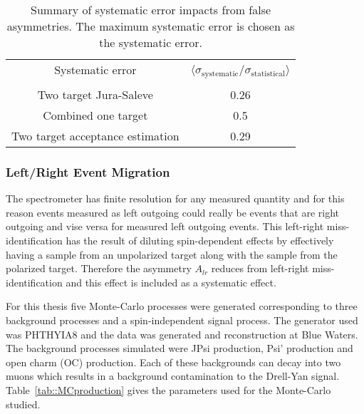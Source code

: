 \begin{table}[h!t]
  \centering
  \begin{tabular}{|c|c|}
    \hline Systematic error& \multirow{2}{9em}{$\langle
      \sigma_{\mathrm{systematic}}/\sigma_{\mathrm{statistical}}
      \rangle$}\\ & \\ \hline
    
    Two target Jura-Saleve& 0.26\\ \hline

    Combined one target& 0.5\\ \hline

    Two target acceptance estimation& 0.29\\ \hline
    
  \end{tabular}
  \caption{Summary of systematic error impacts from false asymmetries.  The
    maximum systematic error is chosen as the systematic error.}
  \label{tab::faSys}
\end{table}


\subsubsection{Left/Right Event Migration}
The spectrometer has finite resolution for any measured quantity and for this
reason events measured as left outgoing could really be events that are right
outgoing and vise versa for measured left outgoing events.  This left-right
miss-identification has the result of diluting spin-dependent effects by
effectively having a sample from an unpolarized target along with the sample
from the polarized target.  Therefore the asymmetry $A_{lr}$ reduces
from left-right miss-identification and this effect is included as a systematic
effect. \par

For this thesis five Monte-Carlo processes were generated corresponding to three
background processes and a spin-independent signal process.  The generator used
was PHTHYIA8 and the data was generated and reconstruction at Blue Waters.  The
background processes simulated were JPsi production, Psi' production and open
charm (OC) production.  Each of these backgrounds can decay into two muons which
results in a background contamination to the Drell-Yan signal.
Table~\ref{tab::MCproduction} gives the parameters used for the Monte-Carlo
studied.

